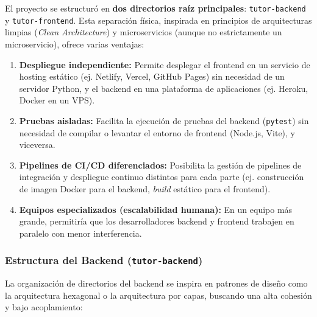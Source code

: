 El proyecto se estructuró en \textbf{dos directorios raíz principales}: \texttt{tutor-backend} y \texttt{tutor-frontend}. Esta separación física, inspirada en principios de arquitecturas limpias (\emph{Clean Architecture}) y microservicios (aunque no estrictamente un microservicio), ofrece varias ventajas:
\begin{enumerate}[leftmargin=*]
  \item \textbf{Despliegue independiente:} Permite desplegar el frontend en un servicio de hosting estático (ej. Netlify, Vercel, GitHub Pages) sin necesidad de un servidor Python, y el backend en una plataforma de aplicaciones (ej. Heroku, Docker en un VPS).
  \item \textbf{Pruebas aisladas:} Facilita la ejecución de pruebas del backend (\texttt{pytest}) sin necesidad de compilar o levantar el entorno de frontend (Node.js, Vite), y viceversa.
  \item \textbf{Pipelines de CI/CD diferenciados:} Posibilita la gestión de pipelines de integración y despliegue continuo distintos para cada parte (ej. construcción de imagen Docker para el backend, \emph{build} estático para el frontend).
  \item \textbf{Equipos especializados (escalabilidad humana):} En un equipo más grande, permitiría que los desarrolladores backend y frontend trabajen en paralelo con menor interferencia.
\end{enumerate}

\subsubsection*{Estructura del Backend (\texttt{tutor-backend})}
\label{sssec:desarrollo_arch_backend}

La organización de directorios del backend se inspira en patrones de diseño como la arquitectura hexagonal o la arquitectura por capas, buscando una alta cohesión y bajo acoplamiento:

